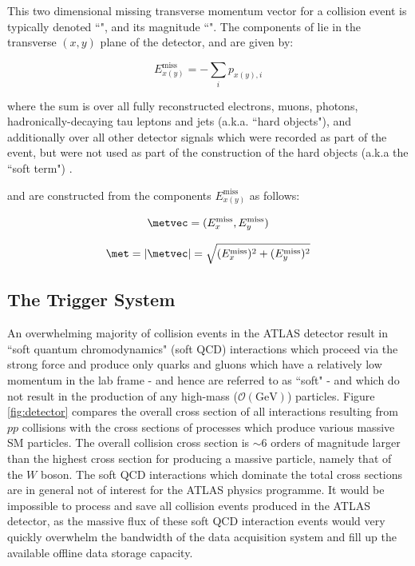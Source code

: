 This two dimensional missing transverse momentum vector for a collision event is typically denoted ``\metvec", and its magnitude ``\met". The components  of \metvec lie in the transverse \((x, y)\) plane of the detector, and are given by:

\begin{equation}
\label{eq:met_components}
E_{x(y)}^\text{miss} = -\sum_i p_{x(y), i}
\end{equation}

\noindent where the sum is over all fully reconstructed electrons, muons, photons, hadronically-decaying tau leptons and jets (a.k.a. ``hard objects"), and additionally over all other detector signals which were recorded as part of the event, but were not used as part of the construction of the hard objects (a.k.a the ``soft term") \cite{met_reconstruction}.

\noindent \metvec and \met are constructed from the components \(E^\text{miss}_{x(y)}\) as follows:

\begin{equation}
\label{eq:met_vec}
\metvec = (E^\text{miss}_{x}, E^\text{miss}_{y})
\end{equation}

\begin{equation}
\label{eq:met_mag}
\met = |\metvec| = \sqrt{(E^\text{miss}_{x})^2 + (E^\text{miss}_{y})^2}
\end{equation}

\subsection{The Trigger System}
\label{sec:trigger}

An overwhelming majority of collision events in the ATLAS detector result in ``soft quantum chromodynamics" (soft QCD) interactions which proceed via the strong force and produce only quarks and gluons which have a relatively low momentum in the lab frame - and hence are referred to as ``soft" - and which do not result in the production of any high-mass (\(\mathcal{O}(\text{GeV})\)) particles. Figure \ref{fig:detector} compares the overall cross section of all interactions resulting from \(pp\) collisions with the cross sections of processes which produce various massive SM particles. The overall collision cross section is \(\sim\)6 orders of magnitude larger than the highest cross section for producing a massive particle, namely that of the \(W\) boson. The soft QCD interactions which dominate the total cross sections are in general not of interest for the ATLAS physics programme. It would be impossible to process and save all collision events produced in the ATLAS detector, as the massive flux of these soft QCD interaction events would very quickly overwhelm the bandwidth of the data acquisition system and fill up the available offline data storage capacity. 

